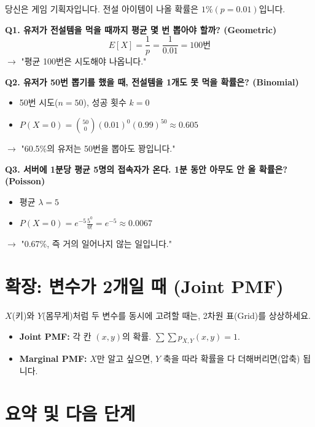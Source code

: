 \documentclass[11pt,a4paper]{book}
\theoremstyle{definition}
\begin{document}
당신은 게임 기획자입니다. 전설 아이템이 나올 확률은 $1\%(p=0.01)$입니다.

\textbf{Q1. 유저가 전설템을 먹을 때까지 평균 몇 번 뽑아야 할까? (Geometric)}
\[ E[X] = \frac{1}{p} = \frac{1}{0.01} = 100\text{번} \]
$\to$ "평균 100번은 시도해야 나옵니다."

\textbf{Q2. 유저가 50번 뽑기를 했을 때, 전설템을 1개도 못 먹을 확률은? (Binomial)}
\begin{itemize}
    \item 50번 시도($n=50$), 성공 횟수 $k=0$
    \item $P(X=0) = \binom{50}{0} (0.01)^0 (0.99)^{50} \approx 0.605$
\end{itemize}
$\to$ "60.5\%의 유저는 50번을 뽑아도 꽝입니다."

\textbf{Q3. 서버에 1분당 평균 5명의 접속자가 온다. 1분 동안 아무도 안 올 확률은? (Poisson)}
\begin{itemize}
    \item 평균 $\lambda = 5$
    \item $P(X=0) = e^{-5} \frac{5^0}{0!} = e^{-5} \approx 0.0067$
\end{itemize}
$\to$ "0.67\%, 즉 거의 일어나지 않는 일입니다."

\section{확장: 변수가 2개일 때 (Joint PMF)}
$X$(키)와 $Y$(몸무게)처럼 두 변수를 동시에 고려할 때는, 2차원 표(Grid)를 상상하세요.
\begin{itemize}
    \item \textbf{Joint PMF:} 각 칸 $(x,y)$의 확률. $\sum \sum p_{X,Y}(x,y) = 1$.
    \item \textbf{Marginal PMF:} $X$만 알고 싶으면, $Y$ 축을 따라 확률을 다 더해버리면(압축) 됩니다.
\end{itemize}

\section{요약 및 다음 단계}
\end{document}
